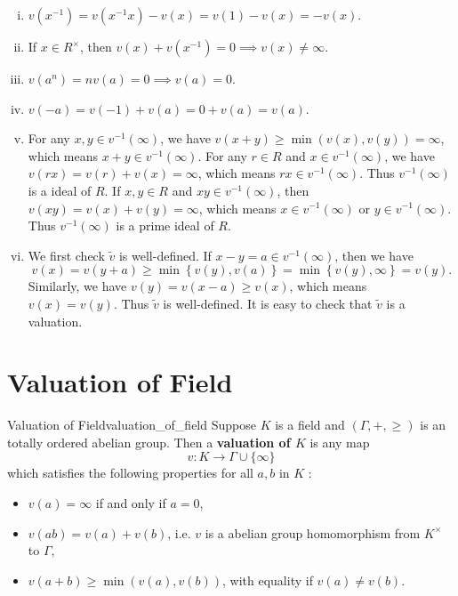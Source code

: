 \begin{prf}
    \begin{enumerate}[(i)]
        \item $v(x^{-1})=v(x^{-1}x)-v(x)=v(1)-v(x)=-v(x)$.
        \item If $x\in R^\times$, then $v(x)+v(x^{-1})=0\implies v(x)\ne \infty$. 
        \item $v(a^n)=nv(a)=0\implies v(a)=0$.
        \item $v(-a)=v(-1)+v(a)=0+v(a)=v(a)$.
        \item For any $x,y\in v^{-1}(\infty)$, we have $v(x+y)\ge \min\left(v(x),v(y)\right)=\infty$, which means $x+y\in v^{-1}(\infty)$. For any $r\in R$ and $x\in v^{-1}(\infty)$, we have $v(rx)=v(r)+v(x)=\infty$, which means $rx\in v^{-1}(\infty)$. Thus $v^{-1}(\infty)$ is a ideal of $R$. If $x,y\in R$ and $xy\in v^{-1}(\infty)$, then $v(xy)=v(x)+v(y)=\infty$, which means $x\in v^{-1}(\infty)$ or $y\in v^{-1}(\infty)$. Thus $v^{-1}(\infty)$ is a prime ideal of $R$.
        \item We first check $\tilde{v}$ is well-defined. If $x-y=a\in v^{-1}(\infty)$, then we have 
        \[
            v(x)=v(y+a)\ge \min\left\{v(y),v(a)\right\}=\min\left\{v(y),\infty\right\}=v(y).
        \]
        Similarly, we have $v(y)=v(x-a)\ge v(x)$, which means $v(x)=v(y)$. Thus $\tilde{v}$ is well-defined. It is easy to check that $\tilde{v}$ is a valuation.
    \end{enumerate}
\end{prf}



\section{Valuation of Field}
\begin{definition}{Valuation of Field}{valuation_of_field}
    Suppose $K$ is a field and $(\Gamma,+,\ge)$ is an totally ordered abelian group. 
Then a \textbf{valuation of $K$} is any map
$$
v: K \rightarrow \Gamma \cup\{\infty\}
$$
which satisfies the following properties for all $a, b$ in $K$ :
\begin{itemize}
    \item $v(a)=\infty$ if and only if $a=0$,
    \item $v(a b)=v(a)+v(b)$, i.e. $v$ is a abelian group homomorphism from $K^{\times}$ to $\Gamma$,
    \item $v(a+b) \geq \min (v(a), v(b))$, with equality if $v(a) \neq v(b)$.
\end{itemize}
\end{definition}

